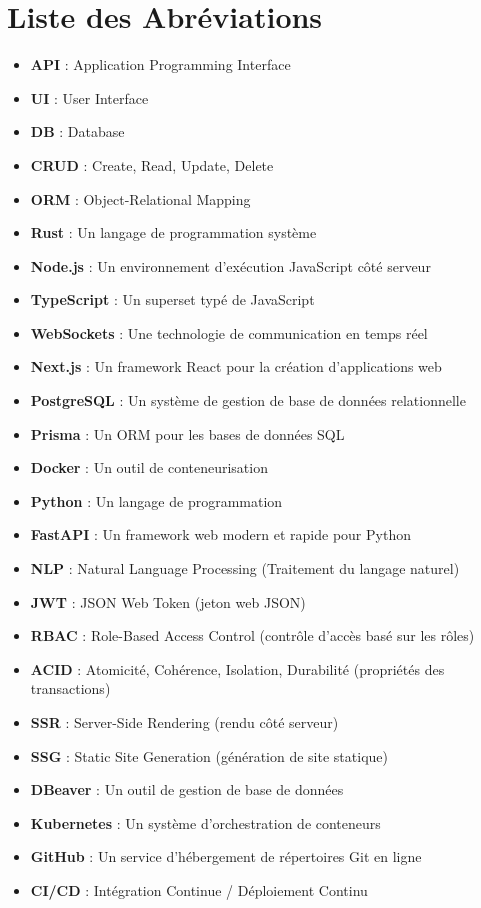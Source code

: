 \documentclass{rapportPfe}
\begin{document}
\chapter*{Liste des Abréviations}
	\begin{itemize}
	  \item \textbf{API} : Application Programming Interface
	  \item \textbf{UI} : User Interface
	  \item \textbf{DB} : Database
	  \item \textbf{CRUD} : Create, Read, Update, Delete
	  \item \textbf{ORM} : Object-Relational Mapping
	  \item \textbf{Rust} : Un langage de programmation système
	  \item \textbf{Node.js} : Un environnement d'exécution JavaScript côté serveur
	  \item \textbf{TypeScript} : Un superset typé de JavaScript
	  \item \textbf{WebSockets} : Une technologie de communication en temps réel
	  \item \textbf{Next.js} : Un framework React pour la création d'applications web
	  \item \textbf{PostgreSQL} : Un système de gestion de base de données relationnelle
	  \item \textbf{Prisma} : Un ORM pour les bases de données SQL
	  \item \textbf{Docker} : Un outil de conteneurisation
	  \item \textbf{Python} : Un langage de programmation
	  \item \textbf{FastAPI} : Un framework web modern et rapide pour Python
	  \item \textbf{NLP} : Natural Language Processing (Traitement du langage naturel)
	  \item \textbf{JWT} : JSON Web Token (jeton web JSON)
	  \item \textbf{RBAC} : Role-Based Access Control (contrôle d'accès basé sur les rôles)
	  \item \textbf{ACID} : Atomicité, Cohérence, Isolation, Durabilité (propriétés des transactions)
	  \item \textbf{SSR} : Server-Side Rendering (rendu côté serveur)
	  \item \textbf{SSG} : Static Site Generation (génération de site statique)
	  \item \textbf{DBeaver} : Un outil de gestion de base de données
	  \item \textbf{Kubernetes} : Un système d'orchestration de conteneurs
	  \item \textbf{GitHub} : Un service d'hébergement de répertoires Git en ligne
	  \item \textbf{CI/CD} : Intégration Continue / Déploiement Continu
	\end{itemize}
\end{document}
